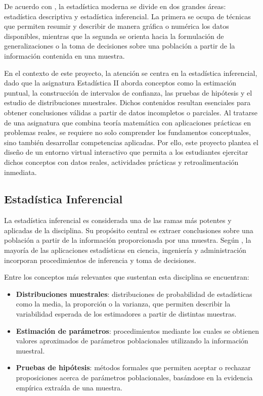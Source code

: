 \documentclass[letter,oneside,12pt,spanish]{report}
\begin{document}
De acuerdo con \textcite{montgomery1996}, la estadística moderna se divide en dos grandes áreas: estadística descriptiva y estadística inferencial. La primera se ocupa de técnicas que permiten resumir y describir de manera gráfica o numérica los datos disponibles, mientras que la segunda se orienta hacia la formulación de generalizaciones o la toma de decisiones sobre una población a partir de la información contenida en una muestra.

En el contexto de este proyecto, la atención se centra en la estadística inferencial, dado que la asignatura Estadística II aborda conceptos como la estimación puntual, la construcción de intervalos de confianza, las pruebas de hipótesis y el estudio de distribuciones muestrales. Dichos contenidos resultan esenciales para obtener conclusiones válidas a partir de datos incompletos o parciales. Al tratarse de una asignatura que combina teoría matemática con aplicaciones prácticas en problemas reales, se requiere no solo comprender los fundamentos conceptuales, sino también desarrollar competencias aplicadas. Por ello, este proyecto plantea el diseño de un entorno virtual interactivo que permita a los estudiantes ejercitar dichos conceptos con datos reales, actividades prácticas y retroalimentación inmediata.

\subsection{Estadística Inferencial}

La estadística inferencial es considerada una de las ramas más potentes y aplicadas de la disciplina. Su propósito central es extraer conclusiones sobre una población a partir de la información proporcionada por una muestra. Según \textcite{montgomery1996}, la mayoría de las aplicaciones estadísticas en ciencia, ingeniería y administración incorporan procedimientos de inferencia y toma de decisiones.

Entre los conceptos más relevantes que sustentan esta disciplina se encuentran:

\begin{itemize}
	\item \textbf{Distribuciones muestrales}: distribuciones de probabilidad de estadísticas como la media, la proporción o la varianza, que permiten describir la variabilidad esperada de los estimadores a partir de distintas muestras.
	
	\item \textbf{Estimación de parámetros}: procedimientos mediante los cuales se obtienen valores aproximados de parámetros poblacionales utilizando la información muestral.
	
	\item \textbf{Pruebas de hipótesis}: métodos formales que permiten aceptar o rechazar proposiciones acerca de parámetros poblacionales, basándose en la evidencia empírica extraída de una muestra.
\end{itemize}
\end{document}
